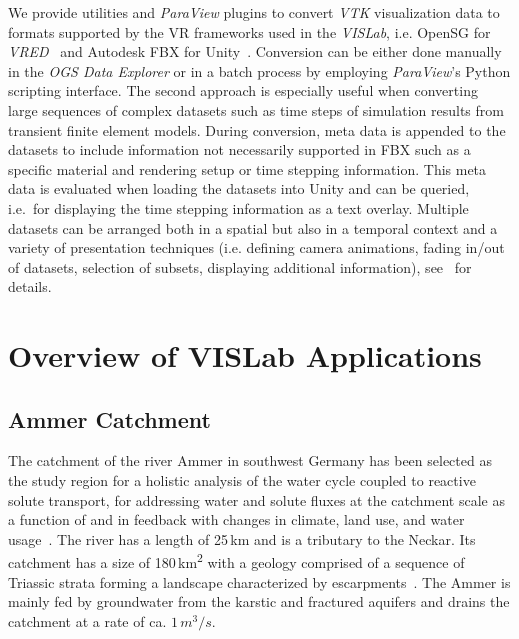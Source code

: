 \documentclass[twocolumn]{svjour3}          %
\begin{document}
We provide utilities and \emph{ParaView} plugins to convert \emph{VTK} visualization data to formats supported by the VR frameworks used in the \emph{VISLab}, i.e. OpenSG for \emph{VRED}~\cite{bilke:vtkosgconverter} and Autodesk FBX for Unity~\cite{bilke:vtkfbxconverter}. Conversion can be either done manually in the \emph{OGS Data Explorer} or in a batch process by employing \emph{ParaView}'s Python scripting interface. The second approach is especially useful when converting large sequences of complex datasets such as time steps of simulation results from transient finite element models. During conversion, meta data is appended to the datasets to include information not necessarily supported in FBX such as a specific material and rendering setup or time stepping information. This meta data is evaluated when loading the datasets into Unity and can be queried, i.e.~for displaying the time stepping information as a text overlay. Multiple datasets can be arranged both in a spatial but also in a temporal context and a variety of presentation techniques (i.e. defining camera animations, fading in/out of datasets, selection of subsets, displaying additional information), see~\cite{rink:eesenvirvis} for details.

\section{Overview of VISLab Applications}
\label{overview-of-VISLab-applications}

\subsection{Ammer Catchment}
\label{ammer-catchment}

The catchment of the river Ammer in southwest Germany has been selected as the study region for a holistic analysis of the water cycle coupled to reactive solute transport, for addressing water and solute fluxes at the catchment scale as a function of and in feedback with changes in climate, land use, and water usage~\cite{grathwohl:wessti}. The river has a length of 25\,km and is a tributary to the Neckar. Its catchment has a size of 180\,km\textsuperscript{2} with a geology comprised of a sequence of Triassic strata forming a landscape characterized by escarpments~\cite{selle:wessti}. The Ammer is mainly fed by groundwater from the karstic and fractured aquifers and drains the catchment at a rate of ca. $1\,m^3/s$.
\end{document}
